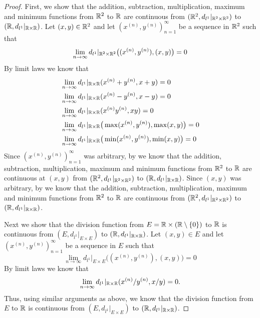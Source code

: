 \begin{proof}
  First, we show that the addition, subtraction, multiplication, maximum and minimum functions from \(\mathbb{R}^2\) to \(\mathbb{R}\) are continuous from \((\mathbb{R}^2, d_{l^1}|_{\mathbb{R}^2 \times \mathbb{R}^2})\) to \((\mathbb{R}, d_{l^1}|_{\mathbb{R} \times \mathbb{R}})\).
  Let \((x, y) \in \mathbb{R}^2\) and let \((x^{(n)}, y^{(n)})_{n = 1}^\infty\) be a sequence in \(\mathbb{R}^2\) such that
  \[
    \lim_{n \to \infty} d_{l^1}|_{\mathbb{R}^2 \times \mathbb{R}^2}\big((x^{(n)}, y^{(n)}), (x, y)\big) = 0
  \]
  By limit laws we know that
  \begin{align*}
     & \lim_{n \to \infty} d_{l^1}|_{\mathbb{R} \times \mathbb{R}}(x^{(n)} + y^{(n)}, x + y) = 0                   \\
     & \lim_{n \to \infty} d_{l^1}|_{\mathbb{R} \times \mathbb{R}}(x^{(n)} - y^{(n)}, x - y) = 0                   \\
     & \lim_{n \to \infty} d_{l^1}|_{\mathbb{R} \times \mathbb{R}}(x^{(n)} y^{(n)}, xy) = 0                        \\
     & \lim_{n \to \infty} d_{l^1}|_{\mathbb{R} \times \mathbb{R}}\big(\max(x^{(n)}, y^{(n)}), \max(x, y)\big) = 0 \\
     & \lim_{n \to \infty} d_{l^1}|_{\mathbb{R} \times \mathbb{R}}\big(\min(x^{(n)}, y^{(n)}), \min(x, y)\big) = 0 \\
  \end{align*}
  Since \((x^{(n)}, y^{(n)})_{n = 1}^\infty\) was arbitrary, by  we know that the addition, subtraction, multiplication, maximum and minimum functions from \(\mathbb{R}^2\) to \(\mathbb{R}\) are continuous at \((x, y)\) from \((\mathbb{R}^2, d_{l^1}|_{\mathbb{R}^2 \times \mathbb{R}^2})\) to \((\mathbb{R}, d_{l^1}|_{\mathbb{R} \times \mathbb{R}})\).
  Since \((x, y)\) was arbitrary, by  we know that the addition, subtraction, multiplication, maximum and minimum functions from \(\mathbb{R}^2\) to \(\mathbb{R}\) are continuous from \((\mathbb{R}^2, d_{l^1}|_{\mathbb{R}^2 \times \mathbb{R}^2})\) to \((\mathbb{R}, d_{l^1}|_{\mathbb{R} \times \mathbb{R}})\).

  Next we show that the division function from \(E = \mathbb{R} \times (\mathbb{R} \setminus \left\lbrace0\right\rbrace)\) to \(\mathbb{R}\) is continuous from \((E, d_{l^1}|_{E \times E})\) to \((\mathbb{R}, d_{l^1}|_{\mathbb{R} \times \mathbb{R}})\).
  Let \((x, y) \in E\) and let \((x^{(n)}, y^{(n)})_{n = 1}^\infty\) be a sequence in \(E\) such that
  \[
    \lim_{n \to \infty} d_{l^1}|_{E \times E}\big((x^{(n)}, y^{(n)}), (x, y)\big) = 0
  \]
  By limit laws we know that
  \[
    \lim_{n \to \infty} d_{l^1}|_{\mathbb{R} \times \mathbb{R}}(x^{(n)} / y^{(n)}, x / y) = 0.
  \]
  Thus, using similar arguments as above, we know that the division function from \(E\) to \(\mathbb{R}\) is continuous from \((E, d_{l^1}|_{E \times E})\) to \((\mathbb{R}, d_{l^1}|_{\mathbb{R} \times \mathbb{R}})\).


\end{proof}

